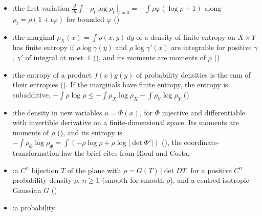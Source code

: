 \documentclass[11pt]{article}
\begin{document}
\begin{itemize}
\begin{itemize}
  \item {}:\newline the first variation
  $\frac{d}{dt}\int -\rho_t\log\rho_t\,\big|_{t=0} = -\int\rho\varphi(\log\rho + 1)$ along
  $\rho_t = \rho(1 + t\varphi)$ for bounded $\varphi$
  ()
  \item {}:\newline the marginal
  $\rho_X(x) = \int\rho(x, y)\,dy$ of a density of finite entropy on $X \times Y$ has finite
  entropy if $\rho\log\gamma(y)$ and $\rho\log\gamma'(x)$ are integrable for positive $\gamma$,
  $\gamma'$ of integral at most~$1$
  (), and its moments are moments of
  $\rho$ ()
  \item {}:\newline the entropy of a
  product $f(x)g(y)$ of probability densities is the sum of their entropies
  (). If the marginals have finite entropy,
  the entropy is subadditive, $-\int\rho\log\rho \le -\int\rho_X\log\rho_X -
  \int\rho_Y\log\rho_Y$ ()
  \item {}:\newline the density
   in new variables $u = \Phi(x)$, for $\Phi$ injective and
  differentiable with invertible derivative on a finite-dimensional space. Its moments are
  moments of $\rho$ (), and its entropy is
  $-\int\rho_\Phi\log\rho_\Phi = \int(-\rho\log\rho + \rho\log|\det\Phi'|)$
  (), the coordinate-transformation law the
  brief cites from Rioul and Costa.
  \item {}:\newline a
  $C^n$ bijection $T$ of the plane with $\rho = G(T)\,|\det DT|$ for a positive $C^n$ probability
  density $\rho$, $n \ge 1$ (smooth for smooth $\rho$), and a centred isotropic Gaussian $G$
  ()
  \item {}:\newline a probability

\end{itemize}
\end{itemize}
\end{document}
